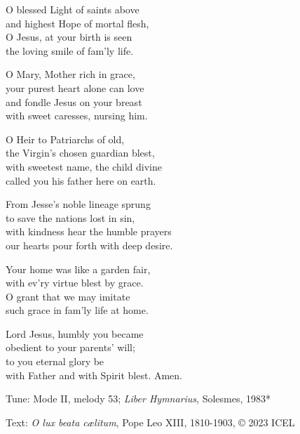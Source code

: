 \hymn

\settowidth{\versewidth}{with Father and with Spirit blest. Amen.}

\begin{hymnverse}%
O blessed Light of saints above\\
and highest Hope of mortal flesh,\\
O Jesus, at your birth is seen\\
the loving smile of fam’ly life.

O Mary, Mother rich in grace,\\
your purest heart alone can love\\
and fondle Jesus on your breast\\
with sweet caresses, nursing him.

O Heir to Patriarchs of old,\\
the Virgin’s chosen guardian blest,\\
with sweetest name, the child divine\\
called you his father here on earth.

From Jesse’s noble lineage sprung\\
to save the nations lost in sin,\\
with kindness hear the humble prayers\\
our hearts pour forth with deep desire.

Your home was like a garden fair,\\
with ev’ry virtue blest by grace.\\
O grant that we may imitate\\
such grace in fam’ly life at home.

Lord Jesus, humbly you became\\
obedient to your parents’ will;\\
to you eternal glory be\\
with Father and with Spirit blest. Amen.
\end{hymnverse}

\begin{hymnsource}
Tune: Mode II, melody 53; \emph{Liber Hymnarius}, Solesmes, 1983*

Text: \emph{O lux beata cælitum}, Pope Leo XIII, 1810-1903, © 2023 ICEL
\end{hymnsource}